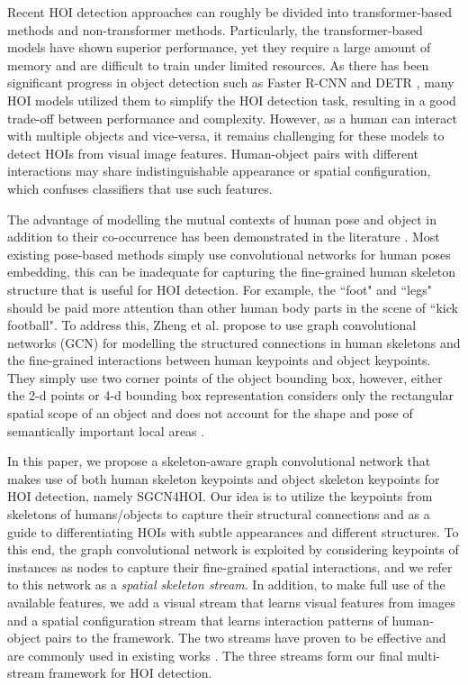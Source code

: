 \documentclass[a4paper, 10pt, conference]{IEEEtran}
\begin{document}
Recent HOI detection approaches can roughly be divided into transformer-based methods \cite{HOITransformer,HOTR,QPIC} and non-transformer methods\cite{VSRL,IPNet,SG2HOI}. Particularly, the transformer-based models have shown superior performance, yet they require a large amount of memory and are difficult to train under limited resources. As there has been significant progress in object detection such as Faster R-CNN \cite{Faster-R-CNN} and DETR \cite{detr}, many HOI models \cite{VSGNet,iCAN} utilized them to simplify the HOI detection task, resulting in a good trade-off between performance and complexity. However, as a human can interact with multiple objects and vice-versa, it remains challenging for these models to detect HOIs from visual image features. Human-object pairs with different interactions may share indistinguishable appearance or spatial configuration, which confuses classifiers that use such features.

The advantage of modelling the mutual contexts of human pose and object in addition to their co-occurrence has been demonstrated in the literature \cite{Yao:CVPR2010}.  
Most existing pose-based methods \cite{TIN,PMFNet,ETAI2022} simply use convolutional networks for human poses embedding, this can be inadequate for capturing the fine-grained human skeleton structure that is useful for HOI detection. For example, the ``foot" and ``legs" should be paid more attention than other human body parts in the scene of ``kick football". To address this, Zheng et al. \cite{SIGN} propose to use graph convolutional networks (GCN) for modelling the structured connections in human skeletons and the fine-grained interactions between human keypoints and object keypoints. They simply use two corner points of the object bounding box, however, either the 2-d points or 4-d bounding box representation considers only the rectangular spatial scope of an object and does not account for the shape and pose of semantically important local areas \cite{RepPoints,bbx-seg}.  

In this paper, we propose a skeleton-aware graph convolutional network that makes use of both human skeleton keypoints and object skeleton keypoints for HOI detection, namely SGCN4HOI. Our idea is to utilize the keypoints from skeletons of humans/objects to capture their structural connections and as a guide to differentiating HOIs with subtle appearances and different structures. To this end, the graph convolutional network is exploited by considering keypoints of instances as nodes to capture their fine-grained spatial interactions, and we refer to this network as a {\it spatial skeleton stream}. In addition, to make full use of the available features, we add a visual stream that learns visual features from images and a spatial configuration stream that learns interaction patterns of human-object pairs to the framework. The two streams have proven to be effective and are commonly used in existing works \cite{VSRL,iCAN,VSGNet}. The three streams form our final multi-stream framework for HOI detection.
\end{document}
